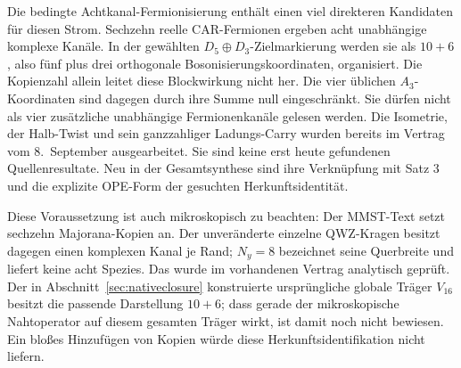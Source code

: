 Die bedingte Achtkanal-Fermionisierung enthält einen viel direkteren Kandidaten für diesen Strom. Sechzehn reelle CAR-Fermionen ergeben acht unabhängige komplexe Kanäle. In der gewählten $D_5\oplus D_3$-Zielmarkierung werden sie als $10+6$, also fünf plus drei orthogonale Bosonisierungskoordinaten, organisiert. Die Kopienzahl allein leitet diese Blockwirkung nicht her. Die vier üblichen $A_3$-Koordinaten sind dagegen durch ihre Summe null eingeschränkt. Sie dürfen nicht als vier zusätzliche unabhängige Fermionenkanäle gelesen werden. Die Isometrie, der Halb-Twist und sein ganzzahliger Ladungs-Carry wurden bereits im Vertrag  vom 8.~September ausgearbeitet. Sie sind keine erst heute gefundenen Quellenresultate. Neu in der Gesamtsynthese sind ihre Verknüpfung mit Satz 3 und die explizite OPE-Form der gesuchten Herkunftsidentität.

Diese Voraussetzung ist auch mikroskopisch zu beachten: Der MMST-Text  setzt sechzehn Majorana-Kopien an. Der unveränderte einzelne QWZ-Kragen besitzt dagegen einen komplexen Kanal je Rand; $N_y=8$ bezeichnet seine Querbreite und liefert keine acht Spezies. Das wurde im vorhandenen Vertrag  analytisch geprüft. Der in Abschnitt~\ref{sec:nativeclosure} konstruierte ursprüngliche globale Träger $V_{16}$ besitzt die passende Darstellung $10+6$; dass gerade der mikroskopische Nahtoperator auf diesem gesamten Träger wirkt, ist damit noch nicht bewiesen. Ein bloßes Hinzufügen von Kopien würde diese Herkunftsidentifikation nicht liefern.

